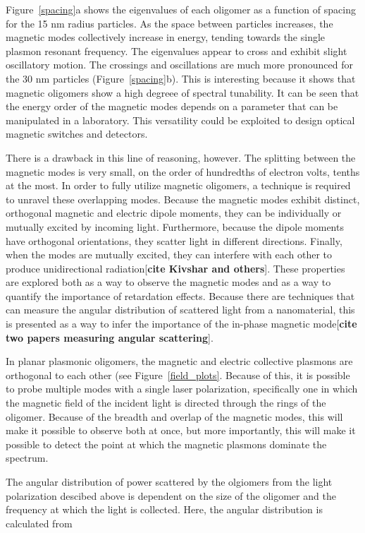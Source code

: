 \documentclass[journal=apchd5,manuscript=article]{achemso}
\begin{document}
Figure~\ref{spacing}a shows the eigenvalues of each oligomer as a function of spacing for the 15 nm radius particles. As the space between particles increases, the magnetic modes collectively increase in energy, tending towards the single plasmon resonant frequency. The eigenvalues appear to cross and exhibit slight oscillatory motion. The crossings and oscillations are much more pronounced for the 30 nm particles (Figure~\ref{spacing}b). This is interesting because it shows that magnetic oligomers show a high degreee of spectral tunability. It can be seen that the energy order of the magnetic modes depends on a parameter that can be manipulated in a laboratory. This versatility could be exploited to design optical magnetic switches and detectors.

There is a drawback in this line of reasoning, however. The splitting between the magnetic modes is very small, on the order of hundredths of electron volts, tenths at the most. In order to fully utilize magnetic oligomers, a technique is required to unravel these overlapping modes. Because the magnetic modes exhibit distinct, orthogonal magnetic and electric dipole moments, they can be individually or mutually excited by incoming light. Furthermore, because the dipole moments have orthogonal orientations, they scatter light in different directions. Finally, when the modes are mutually excited, they can interfere with each other to produce unidirectional radiation[\textbf{cite Kivshar and others}]. These properties are explored both as a way to observe the magnetic modes and as a way to quantify the importance of retardation effects. Because there are techniques that can measure the angular distribution of scattered light from a nanomaterial, this is presented as a way to infer the importance of the in-phase magnetic mode[\textbf{cite two papers measuring angular scattering}].

In planar plasmonic oligomers, the magnetic and electric collective plasmons are orthogonal to each other (see Figure~\ref{field_plots}. Because of this, it is possible to probe multiple modes with a single laser polarization, specifically one in which the magnetic field of the incident light is directed through the rings of the oligomer. Because of the breadth and overlap of the magnetic modes, this will make it possible to observe both at once, but more importantly, this will make it possible to detect the point at which the magnetic plasmons dominate the spectrum.

The angular distribution of power scattered by the olgiomers from the light polarization descibed above is dependent on the size of the oligomer and the frequency at which the light is collected. Here, the angular distribution is calculated from
\end{document}
